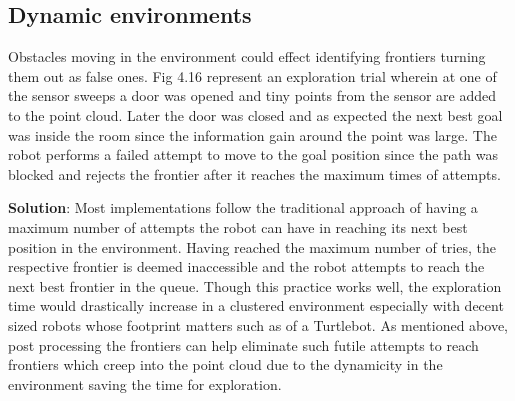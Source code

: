 \subsection{Dynamic environments}
Obstacles moving in the environment could effect identifying frontiers turning them out as false ones. Fig 4.16 represent an exploration trial wherein at one of the sensor sweeps a door was opened and tiny points from the sensor are added to the point cloud. Later the door was closed and as expected the next best goal was inside the room since the information gain around the point was large. The robot performs a failed attempt to move to the goal position since the path was blocked and rejects the frontier after it reaches the maximum times of attempts. 

\textbf{Solution}:
Most implementations follow the traditional approach of having a maximum number of attempts the robot can have in reaching its next best position in the environment. Having reached the maximum number of tries, the respective frontier is deemed inaccessible and the robot attempts to reach the next best frontier in the queue. Though this practice works well, the exploration time would drastically increase in a clustered environment especially with decent sized robots whose footprint matters such as of a Turtlebot. As mentioned above, post processing the frontiers can help eliminate such futile attempts to reach frontiers which creep into the point cloud due to the dynamicity in the environment saving the time for exploration. 
